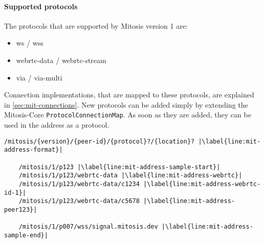 \paragraph{Supported protocols}
The protocols that are supported by Mitosis version 1 are:
\begin{itemize}
    \item ws / wss
    \item webrtc-data / webrtc-stream
    \item via / via-multi
\end{itemize}
Connection implementations, that are mapped to these protocols, are explained in \vref{sec:mit-connections}.
New protocols can be added simply by extending the Mitosis-Core \lstinline|ProtocolConnectionMap|. As soon as they are added, they can be used in the address as a protocol.

\begin{Listing}
\begin{lstlisting}[basicstyle=\footnotesize\ttfamily,xleftmargin=3em]
    /mitosis/{version}/{peer-id}/{protocol}?/{location}? |\label{line:mit-address-format}|
    
    /mitosis/1/p123 |\label{line:mit-address-sample-start}|
    /mitosis/1/p123/webrtc-data |\label{line:mit-address-webrtc}|
    /mitosis/1/p123/webrtc-data/c1234 |\label{line:mit-address-webrtc-id-1}|
    /mitosis/1/p123/webrtc-data/c5678 |\label{line:mit-address-peer123}|

    /mitosis/1/p007/wss/signal.mitosis.dev |\label{line:mit-address-sample-end}|
\end{lstlisting}
\label{lst:mit-address}
\caption{Mitosis address format and sample addresses}
\end{Listing}
